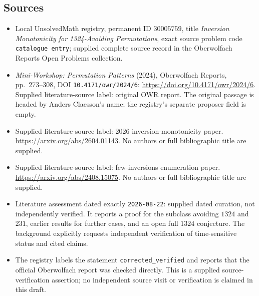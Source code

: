 \documentclass[11pt]{article}
\begin{document}
\subsection{Sources}
\begin{itemize}
\item Local UnsolvedMath registry, permanent ID \(30005759\), title \emph{Inversion Monotonicity for 1324-Avoiding Permutations}, exact source problem code \texttt{catalogue entry}; supplied complete source record in the Oberwolfach Reports Open Problems collection.
\item \emph{Mini-Workshop: Permutation Patterns} (2024), Oberwolfach Reports, pp.\ 273--308, DOI \texttt{10.4171/owr/2024/6}: \url{https://doi.org/10.4171/owr/2024/6}. Supplied literature-source label: original OWR report. The original passage is headed by Anders Claesson's name; the registry's separate proposer field is empty.
\item Supplied literature-source label: 2026 inversion-monotonicity paper. \url{https://arxiv.org/abs/2604.01143}. No authors or full bibliographic title are supplied.
\item Supplied literature-source label: few-inversions enumeration paper. \url{https://arxiv.org/abs/2408.15075}. No authors or full bibliographic title are supplied.
\item Literature assessment dated exactly \texttt{2026-08-22}: supplied dated curation, not independently verified. It reports a proof for the subclass avoiding \(1324\) and \(231\), earlier results for further cases, and an open full \(1324\) conjecture. The background explicitly requests independent verification of time-sensitive status and cited claims.
\item The registry labels the statement \texttt{corrected\_verified} and reports that the official Oberwolfach report was checked directly. This is a supplied source-verification assertion; no independent source visit or verification is claimed in this draft.
\end{itemize}
\end{document}
